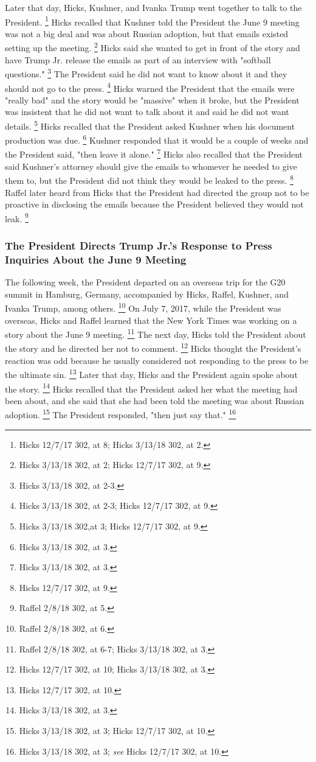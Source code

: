 Later that day, Hicks, Kushner, and Ivanka Trump went together to talk to the President.%
\footnote{Hicks 12/7/17 302, at 8;
Hicks 3/13/18 302, at 2.}
Hicks recalled that Kushner told the President the June 9 meeting was not a big deal and was about Russian adoption, but that emails existed setting up the meeting.%
\footnote{Hicks 3/13/18 302, at 2;
Hicks 12/7/17 302, at 9.}
Hicks said she wanted to get in front of the story and have Trump Jr. release the emails as part of an interview with "softball questions."%
\footnote{Hicks 3/13/18 302, at 2-3.}
The President said he did not want to know about it and they should not go to the press.%
\footnote{Hicks 3/13/18 302, at 2-3;
Hicks 12/7/17 302, at 9.}
Hicks warned the President that the emails were "really bad" and the story would be "massive" when it broke, but the President was insistent that he did not want to talk about it and said he did not want details.%
\footnote{Hicks 3/13/18 302,at 3;
Hicks 12/7/17 302, at 9.}
Hicks recalled that the President asked Kushner when his document production was due.%
\footnote{Hicks 3/13/18 302, at 3.}
Kushner responded that it would be a couple of weeks and the President said, "then leave it alone."%
\footnote{Hicks 3/13/18 302, at 3.}
Hicks also recalled that the President said Kushner's attorney should give the emails to whomever he needed to give them to, but the President did not think they would be leaked to the press.%
\footnote{Hicks 12/7/17 302, at 9.}
Raffel later heard from Hicks that the President had directed the group not to be proactive in disclosing the emails because the President believed they would not leak.%
\footnote{Raffel 2/8/18 302, at 5.}

\subsubsection{The President Directs Trump Jr.'s Response to Press Inquiries About the June 9 Meeting}

The following week, the President departed on an overseas trip for the G20 summit in Hamburg, Germany, accompanied by Hicks, Raffel, Kushner, and Ivanka Trump, among others.%
\footnote{Raffel 2/8/18 302, at 6.}
On July 7, 2017, while the President was overseas, Hicks and Raffel learned that the New York Times was working on a story about the June 9 meeting.%
\footnote{Raffel 2/8/18 302, at 6-7;
Hicks 3/13/18 302, at 3.}
The next day, Hicks told the President about the story and he directed her not to comment.%
\footnote{Hicks 12/7/17 302, at 10;
Hicks 3/13/18 302, at 3.}
Hicks thought the President's reaction was odd because he usually considered not responding to the press to be the ultimate sin.%
\footnote{Hicks 12/7/17 302, at 10.}
Later that day, Hicks and the President again spoke about the story.%
\footnote{Hicks 3/13/18 302, at 3.}
Hicks recalled that the President asked her what the meeting had been about, and she said that she had been told the meeting was about Russian adoption.%
\footnote{Hicks 3/13/18 302, at 3;
Hicks 12/7/17 302, at 10.}
The President responded, "then just say that."%
\footnote{Hicks 3/13/18 302, at 3;
\textit{see} Hicks 12/7/17 302, at 10.}

